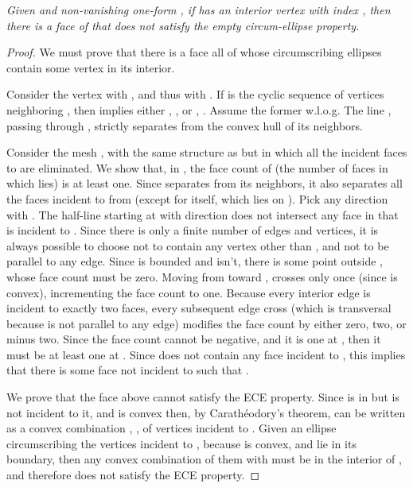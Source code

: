 \documentclass[11pt]{article}
\begin{document}
\emph{
Given  and non-vanishing one-form , if 
has an interior vertex  with index
, then there is a face  of
 that does not satisfy the empty circum-ellipse property.  
}
\begin{proof}
We must prove that there is a face  all of whose circumscribing ellipses
contain some vertex in its interior. 

Consider the vertex  with
, and thus
with . If  is the cyclic sequence of vertices neighboring
, then 
 implies either , , or , . 
Assume the former w.l.o.g. The line , passing through
, strictly separates  from the convex hull of its neighbors. 

Consider the mesh , with the same structure as  but in which all the incident faces to 
are eliminated. 
We show that, in , the face count of  (the number of faces in which  lies) is at
least one. 
Since  separates  from its neighbors, it also separates all the faces
incident to  from  (except for  itself, which lies on ). 
Pick any direction  with . 
The half-line  starting at  with direction  does not intersect any face in  that is incident to . 
Since there is only a finite number of edges and vertices, it is always
possible to choose  not to contain any vertex other than , and not to be parallel to any edge. 
Since  is bounded and  isn't, there is
some point  outside , whose face count must be zero. 
Moving from  toward ,  crosses  only once 
(since  is convex), incrementing the face count to one. 
Because every interior edge is incident to exactly two faces, 
every subsequent edge cross (which is transversal because  is not
parallel to any edge) modifies the face count by either zero, two, or
minus two. Since the face count cannot be negative, and it is one at 
, then it must be at least one at . 
Since  does not contain any face incident to , 
this implies that there is
some face  not incident to  such that . 

We prove that the face  above cannot satisfy the ECE property. 
Since  is in  but is not incident to it, and  is convex
then, by Carath\'eodory's theorem,  can be written as a 
convex combination ,
,  of vertices 
incident to . 
Given an ellipse  circumscribing the vertices incident to , 
because  is convex, and  lie in its boundary, 
then any convex combination of them with  must be in the
interior of , and therefore  does not satisfy the ECE property. 
\end{proof}
\end{document}
